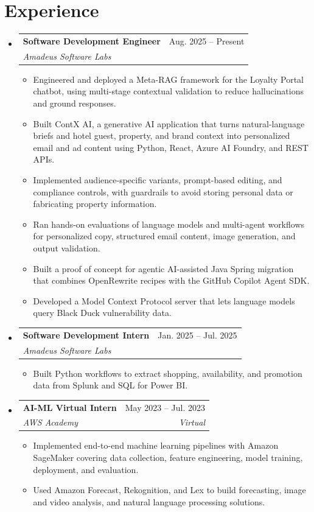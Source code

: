 \documentclass[a4paper,11pt]{article}
\makeatletter
\newcommand{\entry}[4]{\item\begin{tabularx}{\textwidth}{@{}Xr@{}}\textbf{#1}& #2\\\textit{\small #3}&\textit{\small #4}\end{tabularx}\vspace{-5pt}}
\newcommand{\bulletpoint}[1]{\item\small{#1}}
\makeatother
\begin{document}
\section{Experience}
\begin{itemize}[leftmargin=0in,label={}]
  \entry{Software Development Engineer}{Aug. 2025 -- Present}{Amadeus Software Labs}{}
  \begin{itemize}
    \bulletpoint{Engineered and deployed a Meta-RAG framework for the Loyalty Portal chatbot, using multi-stage contextual validation to reduce hallucinations and ground responses.}
    \bulletpoint{Built ContX AI, a generative AI application that turns natural-language briefs and hotel guest, property, and brand context into personalized email and ad content using Python, React, Azure AI Foundry, and REST APIs.}
    \bulletpoint{Implemented audience-specif{}ic variants, prompt-based editing, and compliance controls, with guardrails to avoid storing personal data or fabricating property information.}
    \bulletpoint{Ran hands-on evaluations of language models and multi-agent workf{}lows for personalized copy, structured email content, image generation, and output validation.}
    \bulletpoint{Built a proof of concept for agentic AI-assisted Java Spring migration that combines OpenRewrite recipes with the GitHub Copilot Agent SDK.}
    \bulletpoint{Developed a Model Context Protocol server that lets language models query Black Duck vulnerability data.}
  \end{itemize}
  \entry{Software Development Intern}{Jan. 2025 -- Jul. 2025}{Amadeus Software Labs}{}
  \begin{itemize}
    \bulletpoint{Built Python workf{}lows to extract shopping, availability, and promotion data from Splunk and SQL for Power BI.}
  \end{itemize}
  \entry{AI-ML Virtual Intern}{May 2023 -- Jul. 2023}{AWS Academy}{Virtual}
  \begin{itemize}
    \bulletpoint{Implemented end-to-end machine learning pipelines with Amazon SageMaker covering data collection, feature engineering, model training, deployment, and evaluation.}
    \bulletpoint{Used Amazon Forecast, Rekognition, and Lex to build forecasting, image and video analysis, and natural language processing solutions.}
  \end{itemize}
\end{itemize}
\end{document}
